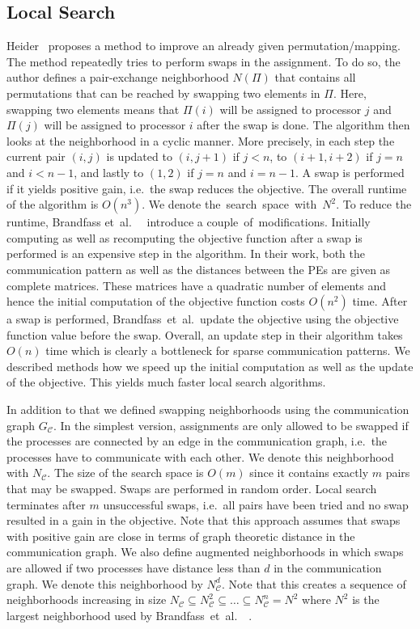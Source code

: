 \documentclass[11pt]{article}
\newcommand{\ie}{i.e.\ }
\newcommand{\etal}{et~al.\ }
\begin{document}
\subsection{Local Search}
Heider~\cite{heider1972computationally} proposes a method to improve an already given permutation/mapping. 
The method repeatedly tries to perform swaps in the assignment. To do so, the author defines a pair-exchange neighborhood $N(\Pi)$ that contains all permutations that can be reached by swapping two elements in $\Pi$. Here, swapping two elements means that $\Pi(i)$ will be assigned to processor $j$ and $\Pi(j)$ will be assigned to processor $i$ after the swap is done. The algorithm then looks at the neighborhood in a cyclic manner. More precisely, in each step the current pair $(i,j)$ is updated to $(i,j+1)$ if $j<n$, to $(i+1,i+2)$ if $j=n$ and $i < n-1$, and lastly to $(1,2)$ if $j=n$ and $i = n-1$. A swap is performed if it yields  positive gain, \ie the swap reduces the objective. The overall runtime of the algorithm is $O(n^3)$. We denote the~search~space~with~$N^2$.
To reduce the runtime, Brandfass \etal~\cite{brandfass2013rank} introduce a couple~of~modifications. 
Initially computing as well as recomputing the objective function after a swap is performed is an expensive step in the algorithm. 
In their work, both the communication pattern as well as the distances between the PEs are given as complete matrices. 
These matrices have a quadratic number of elements and hence the initial computation of the objective function costs $O(n^2)$ time.
After a swap is performed, Brandfass~\etal update the objective using the objective function value before the swap. 
Overall, an update step in their algorithm takes $O(n)$ time which is clearly a bottleneck for sparse communication patterns. 
We described methods how we speed up the initial computation as well as the update of the objective. This yields much faster local search algorithms.

In addition to that we defined swapping neighborhoods using the communication graph $G_\mathcal{C}$. 
In the simplest version, assignments are only allowed to be swapped if the processes are connected by an edge in the communication graph, \ie the processes have to communicate with each other. 
We denote this neighborhood with $N_\mathcal{C}$. The size of the search space is $O(m)$ since it contains exactly $m$ pairs that may be swapped. 
Swaps are performed in random order. 
Local search terminates after $m$ unsuccessful swaps, \ie all pairs have been tried and no swap resulted in a gain in the objective.
Note that this approach assumes that swaps with positive gain are close in terms of graph theoretic distance in the communication graph. 
We also define augmented neighborhoods in which swaps are allowed if two processes have distance less than $d$ in the communication graph. We denote this neighborhood by $N^d_\mathcal{C}$. Note that this creates a sequence of neighborhoods increasing in size $N_\mathcal{C} \subseteq N^2_\mathcal{C} \subseteq \ldots \subseteq N^n_\mathcal{C} =  N^2$ where $N^2$ is the largest neighborhood used by Brandfass~\etal~\cite{brandfass2013rank}.
\end{document}
